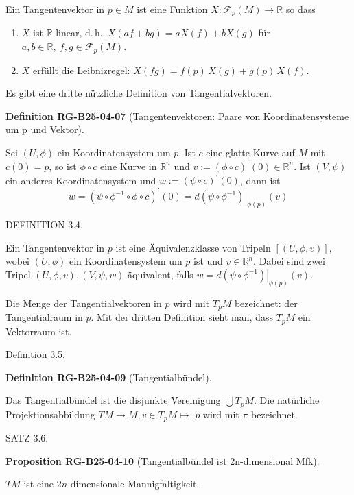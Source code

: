 \documentclass[10pt, letterpaper]{article}
\newcommand{\CustomHeading}[3]{%
  \par\medskip\noindent%
  \textbf{#1 #2} \textnormal{(#3)}.\enskip%
}
\newenvironment{DEF}[2]{\begin{unitbox}\CustomHeading{Definition}{#1}{#2}}{\end{unitbox}}
\newenvironment{PROP}[2]{\begin{unitbox}\CustomHeading{Proposition}{#1}{#2}}{\end{unitbox}}
\begin{document}
Ein Tangentenvektor in $p \in M$ ist eine Funktion $X: \mathcal{F}_{p}(M) \rightarrow \mathbb{R}$ so dass
\begin{enumerate}
  \item $X$ ist $\mathbb{R}$-linear, d.\,h.\ $X(a f + b g) = a X(f) + b X(g)$ für $a, b \in \mathbb{R},\ f, g \in \mathcal{F}_{p}(M)$.
  \item $X$ erfüllt die Leibnizregel: $X(fg) = f(p)\, X(g) + g(p)\, X(f)$.
\end{enumerate}

Es gibt eine dritte nützliche Definition von Tangentialvektoren.


\begin{DEF}{RG-B25-04-07}{Tangentenvektoren: Paare von Koordinatensysteme um p und Vektor}
Sei $(U, \phi)$ ein Koordinatensystem um $p$. Ist $c$ eine glatte Kurve auf $M$ mit $c(0)=p$, so ist $\phi \circ c$ eine Kurve in $\mathbb{R}^{n}$ und $v:=(\phi \circ c)^{\prime}(0) \in \mathbb{R}^{n}$. Ist $(V, \psi)$ ein anderes Koordinatensystem und $w:=(\psi \circ c)^{\prime}(0)$, dann ist
$$
w=\left(\psi \circ \phi^{-1} \circ \phi \circ c\right)^{\prime}(0)=\left.d\left(\psi \circ \phi^{-1}\right)\right|_{\phi(p)}(v)
$$
\end{DEF}



DEFINITION 3.4. 

Ein Tangentenvektor in $p$ ist eine Äquivalenzklasse von Tripeln $[(U, \phi, v)]$, wobei $(U, \phi)$ ein Koordinatensystem um $p$ ist und $v \in \mathbb{R}^{n}$. Dabei sind zwei Tripel $(U, \phi, v),(V, \psi, w)$ äquivalent, falls $w=\left.d\left(\psi \circ \phi^{-1}\right)\right|_{\phi(p)}(v)$.



Die Menge der Tangentialvektoren in $p$ wird mit $T_{p} M$ bezeichnet: der Tangentialraum in $p$. Mit der dritten Definition sieht man, dass $T_{p} M$ ein Vektorraum ist.


Definition 3.5. 

\begin{DEF}{RG-B25-04-09}{Tangentialbündel}
Das Tangentialbündel ist die disjunkte Vereinigung $\bigcup T_{p} M$. Die natürliche Projektionsabbildung $T M \rightarrow M, v \in T_{p} M \mapsto$ $p$ wird mit $\pi$ bezeichnet.
\end{DEF}



SATZ 3.6. 

\begin{PROP}{RG-B25-04-10}{Tangentialbündel ist 2n-dimensional Mfk}
$TM$ ist eine $2 n$-dimensionale Mannigfaltigkeit.
\end{PROP}
\end{document}
